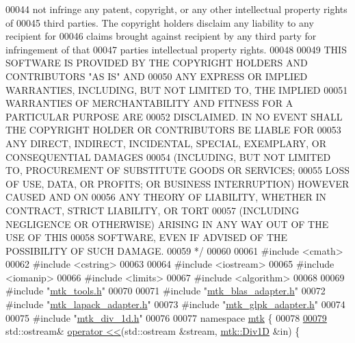 \begin{DoxyCode}
00044 \textcolor{comment}{not infringe any patent, copyright, or any other intellectual property rights of}
00045 \textcolor{comment}{third parties. The copyright holders disclaim any liability to any recipient for}
00046 \textcolor{comment}{claims brought against recipient by any third party for infringement of that}
00047 \textcolor{comment}{parties intellectual property rights.}
00048 \textcolor{comment}{}
00049 \textcolor{comment}{THIS SOFTWARE IS PROVIDED BY THE COPYRIGHT HOLDERS AND CONTRIBUTORS "AS IS" AND}
00050 \textcolor{comment}{ANY EXPRESS OR IMPLIED WARRANTIES, INCLUDING, BUT NOT LIMITED TO, THE IMPLIED}
00051 \textcolor{comment}{WARRANTIES OF MERCHANTABILITY AND FITNESS FOR A PARTICULAR PURPOSE ARE}
00052 \textcolor{comment}{DISCLAIMED. IN NO EVENT SHALL THE COPYRIGHT HOLDER OR CONTRIBUTORS BE LIABLE FOR}
00053 \textcolor{comment}{ANY DIRECT, INDIRECT, INCIDENTAL, SPECIAL, EXEMPLARY, OR CONSEQUENTIAL DAMAGES}
00054 \textcolor{comment}{(INCLUDING, BUT NOT LIMITED TO, PROCUREMENT OF SUBSTITUTE GOODS OR SERVICES;}
00055 \textcolor{comment}{LOSS OF USE, DATA, OR PROFITS; OR BUSINESS INTERRUPTION) HOWEVER CAUSED AND ON}
00056 \textcolor{comment}{ANY THEORY OF LIABILITY, WHETHER IN CONTRACT, STRICT LIABILITY, OR TORT}
00057 \textcolor{comment}{(INCLUDING NEGLIGENCE OR OTHERWISE) ARISING IN ANY WAY OUT OF THE USE OF THIS}
00058 \textcolor{comment}{SOFTWARE, EVEN IF ADVISED OF THE POSSIBILITY OF SUCH DAMAGE.}
00059 \textcolor{comment}{*/}
00060 
00061 \textcolor{preprocessor}{#include <cmath>}
00062 \textcolor{preprocessor}{#include <cstring>}
00063 
00064 \textcolor{preprocessor}{#include <iostream>}
00065 \textcolor{preprocessor}{#include <iomanip>}
00066 \textcolor{preprocessor}{#include <limits>}
00067 \textcolor{preprocessor}{#include <algorithm>}
00068 
00069 \textcolor{preprocessor}{#include "\hyperlink{mtk__tools_8h}{mtk\_tools.h}"}
00070 
00071 \textcolor{preprocessor}{#include "\hyperlink{mtk__blas__adapter_8h}{mtk\_blas\_adapter.h}"}
00072 \textcolor{preprocessor}{#include "\hyperlink{mtk__lapack__adapter_8h}{mtk\_lapack\_adapter.h}"}
00073 \textcolor{preprocessor}{#include "\hyperlink{mtk__glpk__adapter_8h}{mtk\_glpk\_adapter.h}"}
00074 
00075 \textcolor{preprocessor}{#include "\hyperlink{mtk__div__1d_8h}{mtk\_div\_1d.h}"}
00076 
00077 \textcolor{keyword}{namespace }\hyperlink{namespacemtk}{mtk} \{
00078 
\hypertarget{mtk__div__1d_8cc_source_l00079}{}\hyperlink{namespacemtk_a12db5e6fff3788f728819a60d5c28d01}{00079} std::ostream& \hyperlink{namespacemtk_ad3bcf52cda59ddb5fc7b4bdce76c46dc}{operator <<}(std::ostream &stream, \hyperlink{classmtk_1_1Div1D}{mtk::Div1D} &in) \{

\end{DoxyCode}
